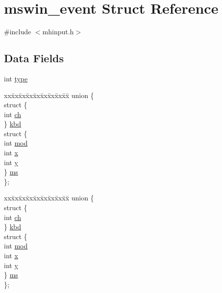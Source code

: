 \hypertarget{structmswin__event}{\section{mswin\+\_\+event Struct Reference}
\label{structmswin__event}
}


{\ttfamily \#include $<$mhinput.\+h$>$}

\subsection*{Data Fields}
\begin{DoxyCompactItemize}
\item 
int \hyperlink{structmswin__event_a2cd42be6dadd3c4d0340108b1c92fee7}{type}
\item 
\begin{tabbing}
xx\=xx\=xx\=xx\=xx\=xx\=xx\=xx\=xx\=\kill
union \{\\
\>struct \{\\
\>\>int \hyperlink{structmswin__event_a65ae83d1c2eb060bc9bffde57071fdb9}{ch}\\
\>\} \hyperlink{structmswin__event_a42d63af297fdf4fdf081198553a74c57}{kbd}\\
\>struct \{\\
\>\>int \hyperlink{structmswin__event_aa6fe170bae6aa15176d400bae478ee70}{mod}\\
\>\>int \hyperlink{structmswin__event_abec4532f18e15b3447b2d586c370a866}{x}\\
\>\>int \hyperlink{structmswin__event_aca428545a7d6ccd45eb16a28c5e93836}{y}\\
\>\} \hyperlink{structmswin__event_a2d692fa31809c0380bcd4698a7029d01}{ms}\\
\}; \\

\end{tabbing}\item 
\begin{tabbing}
xx\=xx\=xx\=xx\=xx\=xx\=xx\=xx\=xx\=\kill
union \{\\
\>struct \{\\
\>\>int \hyperlink{structmswin__event_a65ae83d1c2eb060bc9bffde57071fdb9}{ch}\\
\>\} \hyperlink{structmswin__event_a3aac2cede6fd42df678df4df934b2de8}{kbd}\\
\>struct \{\\
\>\>int \hyperlink{structmswin__event_aa6fe170bae6aa15176d400bae478ee70}{mod}\\
\>\>int \hyperlink{structmswin__event_abec4532f18e15b3447b2d586c370a866}{x}\\
\>\>int \hyperlink{structmswin__event_aca428545a7d6ccd45eb16a28c5e93836}{y}\\
\>\} \hyperlink{structmswin__event_a6cceb5939ea3f2880095787171e064cc}{ms}\\
\}; \\

\end{tabbing}\end{DoxyCompactItemize}


